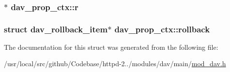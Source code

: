 \subsubsection[{\texorpdfstring{r}{r}}]{$\ast$ dav\+\_\+prop\+\_\+ctx\+::r}\hypertarget{structdav__prop__ctx_a375a8477199e03c98ae5d3a8ae40525f}{}\label{structdav__prop__ctx_a375a8477199e03c98ae5d3a8ae40525f}
\subsubsection[{\texorpdfstring{rollback}{rollback}}]{\setlength{\rightskip}{0pt plus 5cm}struct {\bf dav\+\_\+rollback\+\_\+item}$\ast$ dav\+\_\+prop\+\_\+ctx\+::rollback}\hypertarget{structdav__prop__ctx_a1c4d12a7cd504a2e39b7af5e15637244}{}\label{structdav__prop__ctx_a1c4d12a7cd504a2e39b7af5e15637244}


The documentation for this struct was generated from the following file\+:\begin{DoxyCompactItemize}
\item 
/usr/local/src/github/\+Codebase/httpd-\/2../modules/dav/main/\hyperlink{mod__dav_8h}{mod\+\_\+dav.\+h}\end{DoxyCompactItemize}
